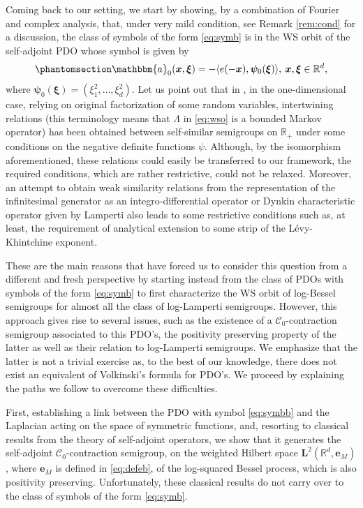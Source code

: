 \documentclass[12pt]{amsart}
\newcommand{\hlabel}{\phantomsection\label}
\numberwithin{equation}{section}
\newcommand{\bb}{\mathbb}
\newcommand{\cc}{\mathcal}
\newcommand{\hpt}[2]{#2}
\newcommand{\bbm}{\mathbbm}
\newcommand{\bmrm}[2][2]{\mathbf{#2}^{#1}}
\theoremstyle{definition}
\theoremstyle{assump}
\theoremstyle{remark}
\begin{document}
Coming back to our setting, we start  by showing, by a combination of Fourier and complex analysis,  that, under very mild condition, see Remark \ref{rem:cond} for a discussion,  the class of  symbols of the form \eqref{eq:symb} is in the WS orbit of the self-adjoint PDO whose symbol is given by
\begin{equation} \hlabel{eq:symbb}
\bbm{a}_0(\bm{x},\bm{\xi})=-\langle e(-\bm{x}),\bm{\psi}_0(\bm{\xi})\rangle, \: \bm{x},\bm{\xi}\in\bb{R}^d, %
\end{equation}
where $\bm{\psi}_0(\bm{\xi})=(\xi^2_1,\ldots,\xi^2_d)$. Let us point out  that in \cite{patiesavov}, in the one-dimensional case, relying on  original factorization of some random variables,   intertwining relations (this terminology means that $\Lambda$ in \eqref{eq:wso} is a bounded Markov operator) has been obtained between self-similar semigroups on $\bb{R}_+$ under some conditions on the negative definite functions $\psi$.  Although, by  the  isomorphism aforementioned, these relations could easily be transferred to our framework, the required conditions, which are  rather restrictive,  could not be relaxed. Moreover, an attempt to obtain weak similarity relations from the representation of the  infinitesimal generator as an integro-differential operator or Dynkin characteristic operator given by Lamperti \cite{Lamperti1972} also leads to some restrictive conditions such as, at least, the requirement of  analytical extension to some strip of the L\'evy-Khintchine exponent.

\hpt{R1}{These are the main reasons that have forced us to consider this question from a different and fresh perspective by starting instead} from the class of PDOs with symbols of the form \eqref{eq:symb} to first characterize the WS orbit of log-Bessel semigroups for almost all the class of log-Lamperti semigroups. However, this approach gives rise to several issues, such as the existence of a $\cc{C}_0$-contraction semigroup associated to this PDO's, the positivity preserving property of the latter as well as their relation to log-Lamperti semigroups. We emphasize that the latter is not a trivial exercise as, to the best of our knowledge, there does not exist an equivalent of Volkinski's formula for PDO's. We proceed by explaining the paths we follow to overcome these difficulties.

First, establishing a link between the PDO with symbol  \eqref{eq:symbb} and the Laplacian acting on the space of symmetric functions, and, resorting to  classical results from the theory of self-adjoint operators, we show that it generates the self-adjoint $\cc{C}_0$-contraction  semigroup, on  the weighted Hilbert space $\bmrm{L}(\bb{R}^d,{\mathbf{e}}_M)$, where ${\mathbf{e}}_M$ is defined in \eqref{eq:defeb}, of the log-squared Bessel process, which is also positivity preserving. Unfortunately, these classical  results do not carry over to the class of symbols of the form \eqref{eq:symb}.
\end{document}
